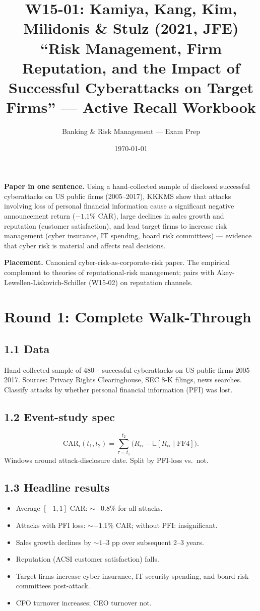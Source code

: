 \documentclass[11pt]{article}
\title{W15-01: Kamiya, Kang, Kim, Milidonis \& Stulz (2021, JFE) \\
\large ``Risk Management, Firm Reputation, and the Impact of Successful Cyberattacks on Target Firms'' --- Active Recall Workbook}
\author{Banking \& Risk Management --- Exam Prep}
\date{\today}
\newcommand{\EV}{\mathbb{E}}
\begin{document}
\maketitle

\begin{keybox}
\textbf{Paper in one sentence.} Using a hand-collected sample of disclosed successful cyberattacks on US public firms (2005--2017), KKKMS show that attacks involving loss of personal financial information cause a significant negative announcement return ($-1.1$\% CAR), large declines in sales growth and reputation (customer satisfaction), and lead target firms to increase risk management (cyber insurance, IT spending, board risk committees) --- evidence that cyber risk is material and affects real decisions.

\textbf{Placement.} Canonical cyber-risk-as-corporate-risk paper. The empirical complement to theories of reputational-risk management; pairs with Akey-Lewellen-Liskovich-Schiller (W15-02) on reputation channels.
\end{keybox}

\section*{Round 1: Complete Walk-Through}

\subsection*{1.1 Data}
Hand-collected sample of 480+ successful cyberattacks on US public firms 2005--2017. Sources: Privacy Rights Clearinghouse, SEC 8-K filings, news searches. Classify attacks by whether personal financial information (PFI) was lost.

\subsection*{1.2 Event-study spec}
\[
\text{CAR}_i(t_1,t_2)=\sum_{\tau=t_1}^{t_2}\!\big(R_{i\tau}-\EV[R_{i\tau}\mid \text{FF4}]\big).
\]
Windows around attack-disclosure date. Split by PFI-loss vs.\ not.

\subsection*{1.3 Headline results}
\begin{itemize}
\item Average $[-1,1]$ CAR: $\sim -0.8$\% for all attacks.
\item Attacks with PFI loss: $\sim -1.1$\% CAR; without PFI: insignificant.
\item Sales growth declines by $\sim 1$--$3$ pp over subsequent 2--3 years.
\item Reputation (ACSI customer satisfaction) falls.
\item Target firms increase cyber insurance, IT security spending, and board risk committees post-attack.
\item CFO turnover increases; CEO turnover not.
\end{itemize}
\end{document}
